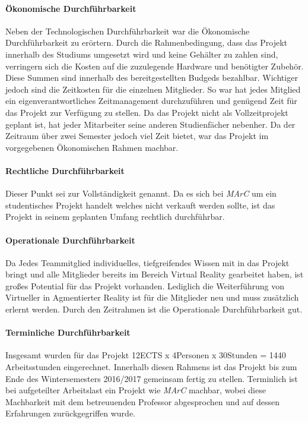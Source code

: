\paragraph{Ökonomische Durchführbarkeit} Neben der Technologischen Durchführbarkeit war die Ökonomische Durchführbarkeit zu erörtern. Durch die Rahmenbedingung, dass das Projekt innerhalb des Studiums umgesetzt wird und keine Gehälter zu zahlen sind, verringern sich die Kosten auf die zuzulegende Hardware und benötigter Zubehör. Diese Summen sind innerhalb des bereitgestellten Budgeds bezahlbar. Wichtiger jedoch sind die Zeitkosten für die einzelnen Mitglieder. So war hat jedes Mitglied ein eigenverantwortliches Zeitmanagement durchzuführen und genügend Zeit für das Projekt zur Verfügung zu stellen. Da das Projekt nicht als Vollzeitprojekt geplant ist, hat jeder Mitarbeiter seine anderen Studienfächer nebenher. Da der Zeitraum über zwei Semester jedoch viel Zeit bietet, war das Projekt im vorgegebenen Ökonomischen Rahmen machbar.

\paragraph{Rechtliche Durchführbarkeit} Dieser Punkt sei zur Vollständigkeit genannt. Da es sich bei \textit{MArC} um ein studentisches Projekt handelt welches nicht verkauft werden sollte, ist das Projekt in seinem geplanten Umfang rechtlich durchführbar.

\paragraph{Operationale Durchführbarkeit} Da Jedes Teammitglied individuelles, tiefgreifendes Wissen mit in das Projekt bringt und alle Mitglieder bereits im Bereich Virtual Reality gearbeitet haben, ist großes Potential für das Projekt vorhanden. Lediglich die Weiterführung von Virtueller in Agmentierter Reality ist für die Mitglieder neu und muss zusätzlich erlernt werden. Durch den Zeitrahmen ist die Operationale Durchführbarkeit gut.


\paragraph{Terminliche Durchführbarkeit} Insgesamt wurden für das Projekt 12ECTS x 4Personen x 30Stunden = 1440 Arbeitsstunden eingerechnet. Innerhalb diesen Rahmens ist das Projekt bis zum Ende des Wintersemesters 2016/2017 gemeinsam fertig zu stellen. Terminlich ist bei aufgeteilter Arbeitslast ein Projekt wie \textit{MArC} machbar, wobei diese Machbarkeit mit dem betreuuenden Professor abgesprochen und auf dessen Erfahrungen zurückgegriffen wurde.

